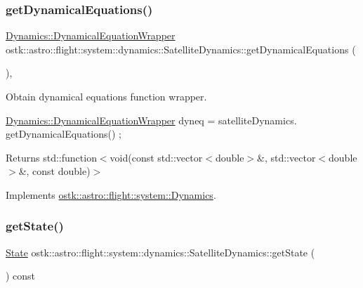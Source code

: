 \subsubsection{\texorpdfstring{get\+Dynamical\+Equations()}{getDynamicalEquations()}}
{\footnotesize\ttfamily \hyperlink{classostk_1_1astro_1_1flight_1_1system_1_1_dynamics_a9b14f4fbea6fe1e96af9e71545d4c77e}{Dynamics\+::\+Dynamical\+Equation\+Wrapper} ostk\+::astro\+::flight\+::system\+::dynamics\+::\+Satellite\+Dynamics\+::get\+Dynamical\+Equations (\begin{DoxyParamCaption}{ }\end{DoxyParamCaption})\hspace{0.3cm}{\ttfamily [override]}, {\ttfamily [virtual]}}



Obtain dynamical equations function wrapper. 


\begin{DoxyCode}
\hyperlink{classostk_1_1astro_1_1flight_1_1system_1_1_dynamics_a9b14f4fbea6fe1e96af9e71545d4c77e}{Dynamics::DynamicalEquationWrapper} dyneq = satelliteDynamics.
      getDynamicalEquations() ;
\end{DoxyCode}
 \begin{DoxyReturn}{Returns}
std\+::function$<$void(const std\+::vector$<$double$>$\&, std\+::vector$<$double$>$\&, const double)$>$ 
\end{DoxyReturn}


Implements \hyperlink{classostk_1_1astro_1_1flight_1_1system_1_1_dynamics_a2001816629758bad7e960af54e87ddaa}{ostk\+::astro\+::flight\+::system\+::\+Dynamics}.

\mbox{\label{classostk_1_1astro_1_1flight_1_1system_1_1dynamics_1_1_satellite_dynamics_addceb352f6da2de12c1e9fe506533740}} 
\subsubsection{\texorpdfstring{get\+State()}{getState()}}
{\footnotesize\ttfamily \hyperlink{classostk_1_1astro_1_1trajectory_1_1_state}{State} ostk\+::astro\+::flight\+::system\+::dynamics\+::\+Satellite\+Dynamics\+::get\+State (\begin{DoxyParamCaption}{ }\end{DoxyParamCaption}) const}



